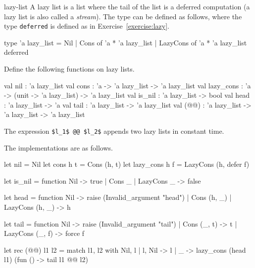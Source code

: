 %
\begin{exercise}{lazy-list}
A lazy list is a list where the tail of the list is a deferred computation (a lazy list is also
called a \emph{stream}).  The type can be defined as follows, where the type \hbox{\lstinline/deferred/} is
defined as in Exercise~\ref{exercise:lazy}.

\begin{ocaml}
type 'a lazy_list =
   Nil
 | Cons of 'a * 'a lazy_list
 | LazyCons of 'a * 'a lazy_list deferred
\end{ocaml}
%
Define the following functions on lazy lists.

\begin{ocamlx}
val nil       : 'a lazy_list
val cons      : 'a -> 'a lazy_list -> 'a lazy_list
val lazy_cons : 'a -> (unit -> 'a lazy_list) -> 'a lazy_list
val is_nil    : 'a lazy_list -> bool
val head      : 'a lazy_list -> 'a
val tail      : 'a lazy_list -> 'a lazy_list
val (@@)      : 'a lazy_list -> 'a lazy_list -> 'a lazy_list
\end{ocamlx}
%
The expression \hbox{\lstinline/$l_1$ @@ $l_2$/} appends two lazy lists in constant time.

\begin{answer}\ifanswers
The implementations are as follows.

\begin{ocamlx}
let nil = Nil
let cons h t = Cons (h, t)
let lazy_cons h f = LazyCons (h, defer f)

let is_nil = function
   Nil -> true
 | Cons _ | LazyCons _ -> false

let head = function
   Nil -> raise (Invalid_argument "head")
 | Cons (h, _)
 | LazyCons (h, _) -> h

let tail = function
   Nil -> raise (Invalid_argument "tail")
 | Cons (_, t) -> t
 | LazyCons (_, f) -> force f

let rec (@@) l1 l2 =
   match l1, l2 with
      Nil, l | l, Nil -> l
    | _ -> lazy_cons (head l1) (fun () -> tail l1 @@ l2)
\end{ocamlx}
\fi\end{answer}
\end{exercise}

